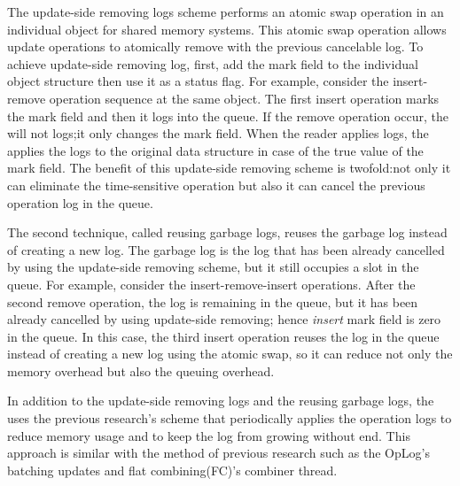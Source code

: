 The update-side removing logs scheme performs an atomic swap operation in an
individual object for shared memory systems.
This atomic swap operation allows update operations to atomically remove with the
previous cancelable log.
To achieve update-side removing log, 
first, add the mark field to the individual object
structure then use it as a status flag. 
For example, consider the insert-remove operation sequence at the same object.
The first insert operation marks the mark field and then it logs into the queue.
If the remove operation occur, the \LDU will not logs;it only changes the mark field.
When the reader applies logs, the \LDU applies the logs to the original data
structure in case of the true value of the mark field.
The benefit of this update-side removing scheme is twofold:not only it can
eliminate the time-sensitive operation but also it can cancel the previous
operation log in the queue.


The second technique, called reusing garbage logs, reuses the garbage log
instead of creating a new log.
The garbage log is the log that has been already cancelled by 
using the update-side removing scheme,
but it still occupies a slot in the queue.
For example, consider the insert-remove-insert operations.
After the second remove operation, the log is remaining in the queue, but it has been
already cancelled by using update-side removing; hence {\it insert} mark field
is zero in the queue.
In this case, the third insert operation reuses the log in the queue instead of 
creating a new log using the atomic swap, so it can reduce not only the memory
overhead but also the queuing overhead.

In addition to the update-side removing logs and the reusing garbage logs,
the \LDU uses the previous research's scheme that periodically applies the operation logs 
to reduce memory usage and to keep the log from growing without end.
This approach is similar with the method of previous research such as the OpLog's
batching updates and flat combining(FC)'s combiner thread.

